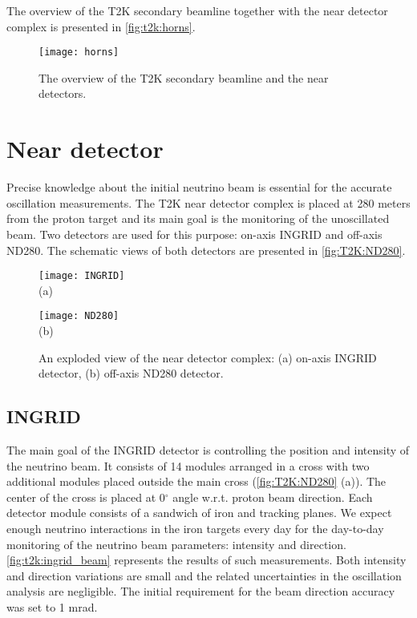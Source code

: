 \documentclass[../main.tex]{subfiles}
\begin{document}
The overview of the T2K secondary beamline together with the near detector complex is presented in \autoref{fig:t2k:horns}.

\begin{figure}[!ht]
  \centering
  \texttt{[image: horns]}
  \caption{The overview of the T2K secondary beamline and the near detectors.}
  \label{fig:t2k:horns}
\end{figure}

\section{Near detector}
\label{sec:T2K:nd}
Precise knowledge about the initial neutrino beam is essential for the accurate oscillation measurements. The T2K near detector complex is placed at 280 meters from the proton target and its main goal is the monitoring of the unoscillated beam. Two detectors are used for this purpose: on-axis INGRID and off-axis ND280. The schematic views of both detectors are presented in \autoref{fig:T2K:ND280}.

\begin{figure}[!ht]
  \centering
  \begin{minipage}{0.49\linewidth}
    \centering
    \texttt{[image: INGRID]} \\ (a)
  \end{minipage}
  \begin{minipage}{0.49\linewidth}
    \centering
    \texttt{[image: ND280]} \\ (b)
  \end{minipage}
    \caption{An exploded view of the near detector complex: (a) on-axis INGRID detector, (b) off-axis ND280 detector.}
    \label{fig:T2K:ND280}
\end{figure}

\subsection{INGRID}
The main goal of the INGRID detector is controlling the position and intensity of the neutrino beam. It consists of 14 modules arranged in a cross with two additional modules placed outside the main cross (\autoref{fig:T2K:ND280} (a)). The center of the cross is placed at 0$^\circ$ angle w.r.t. proton beam direction. Each detector module consists of a sandwich of iron and tracking planes. We expect enough neutrino interactions in the iron targets every day for the day-to-day monitoring of the neutrino beam parameters: intensity and direction. \autoref{fig:t2k:ingrid_beam} represents the results of such measurements. Both intensity and direction variations are small and the related uncertainties in the oscillation analysis are negligible. The initial requirement for the beam direction accuracy was set to 1 mrad.
\end{document}
